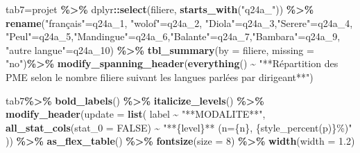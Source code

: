\documentclass[
]{article}
\newenvironment{Shaded}{\begin{snugshade}}{\end{snugshade}}
\newcommand{\AttributeTok}[1]{\textcolor[rgb]{0.13,0.29,0.53}{#1}}
\newcommand{\ConstantTok}[1]{\textcolor[rgb]{0.56,0.35,0.01}{#1}}
\newcommand{\DecValTok}[1]{\textcolor[rgb]{0.00,0.00,0.81}{#1}}
\newcommand{\FloatTok}[1]{\textcolor[rgb]{0.00,0.00,0.81}{#1}}
\newcommand{\FunctionTok}[1]{\textcolor[rgb]{0.13,0.29,0.53}{\textbf{#1}}}
\newcommand{\NormalTok}[1]{#1}
\newcommand{\OtherTok}[1]{\textcolor[rgb]{0.56,0.35,0.01}{#1}}
\newcommand{\SpecialCharTok}[1]{\textcolor[rgb]{0.81,0.36,0.00}{\textbf{#1}}}
\newcommand{\StringTok}[1]{\textcolor[rgb]{0.31,0.60,0.02}{#1}}
\begin{document}
\begin{Shaded}
\begin{Highlighting}[]
\NormalTok{tab7}\OtherTok{=}\NormalTok{projet }\SpecialCharTok{\%\textgreater{}\%}
\NormalTok{  dplyr}\SpecialCharTok{::}\FunctionTok{select}\NormalTok{(filiere, }\FunctionTok{starts\_with}\NormalTok{(}\StringTok{"q24a\_"}\NormalTok{)) }\SpecialCharTok{\%\textgreater{}\%}
     \FunctionTok{rename}\NormalTok{(}\StringTok{"français"}\OtherTok{=}\NormalTok{q24a\_1, }\StringTok{"wolof"}\OtherTok{=}\NormalTok{q24a\_2, }\StringTok{"Diola"}\OtherTok{=}\NormalTok{q24a\_3,}\StringTok{"Serere"}\OtherTok{=}\NormalTok{q24a\_4,}
            \StringTok{"Peul"}\OtherTok{=}\NormalTok{q24a\_5,}\StringTok{"Mandingue"}\OtherTok{=}\NormalTok{q24a\_6,}\StringTok{"Balante"}\OtherTok{=}\NormalTok{q24a\_7,}\StringTok{"Bambara"}\OtherTok{=}\NormalTok{q24a\_9,}
            \StringTok{"autre langue"}\OtherTok{=}\NormalTok{q24a\_10) }\SpecialCharTok{\%\textgreater{}\%} 
    \FunctionTok{tbl\_summary}\NormalTok{(}\AttributeTok{by =}\NormalTok{ filiere, }\AttributeTok{missing =} \StringTok{"no"}\NormalTok{)}\SpecialCharTok{\%\textgreater{}\%}
      \FunctionTok{modify\_spanning\_header}\NormalTok{(}\FunctionTok{everything}\NormalTok{() }\SpecialCharTok{\textasciitilde{}} \StringTok{"**Répartition }
\StringTok{                             des PME selon le nombre  filiere }
\StringTok{                             suivant les langues parlées par dirigeant**"}\NormalTok{)}

\NormalTok{tab7}\SpecialCharTok{\%\textgreater{}\%} \FunctionTok{bold\_labels}\NormalTok{() }\SpecialCharTok{\%\textgreater{}\%} 
  \FunctionTok{italicize\_levels}\NormalTok{()  }\SpecialCharTok{\%\textgreater{}\%} 
  \FunctionTok{modify\_header}\NormalTok{(}\AttributeTok{update =} \FunctionTok{list}\NormalTok{( label }\SpecialCharTok{\textasciitilde{}} \StringTok{"**MODALITE**"}\NormalTok{, }
                               \FunctionTok{all\_stat\_cols}\NormalTok{(}\AttributeTok{stat\_0 =} \ConstantTok{FALSE}\NormalTok{) }\SpecialCharTok{\textasciitilde{}} 
                                 \StringTok{"**\{level\}** (n=\{n\}, \{style\_percent(p)\}\%)"}
\NormalTok{  )) }\SpecialCharTok{\%\textgreater{}\%}  \FunctionTok{as\_flex\_table}\NormalTok{() }\SpecialCharTok{\%\textgreater{}\%}
  \FunctionTok{fontsize}\NormalTok{(}\AttributeTok{size =} \DecValTok{8}\NormalTok{) }\SpecialCharTok{\%\textgreater{}\%}
  \FunctionTok{width}\NormalTok{(}\AttributeTok{width =} \FloatTok{1.2}\NormalTok{)}
\end{Highlighting}
\end{Shaded}
\end{document}
